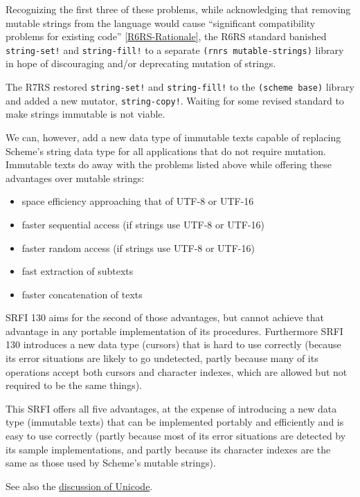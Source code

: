 Recognizing the first three of these problems, while acknowledging that
removing mutable strings from the language would cause ``significant
compatibility problems for existing code''
\protect\hyperlink{R6RS-Rationale}{{[}R6RS-Rationale{]}}, the R6RS
standard banished \texttt{string-set!} and \texttt{string-fill!} to a
separate \texttt{(rnrs\ mutable-strings)} library in hope of
discouraging and/or deprecating mutation of strings.

The R7RS restored \texttt{string-set!} and \texttt{string-fill!} to the
\texttt{(scheme\ base)} library and added a new mutator,
\texttt{string-copy!}. Waiting for some revised standard to make strings
immutable is not viable.

We can, however, add a new data type of immutable texts capable of
replacing Scheme's string data type for all applications that do not
require mutation. Immutable texts do away with the problems listed above
while offering these advantages over mutable strings:

\begin{itemize}
\tightlist
\item
  space efficiency approaching that of UTF-8 or UTF-16
\item
  faster sequential access (if strings use UTF-8 or UTF-16)
\item
  faster random access (if strings use UTF-8 or UTF-16)
\item
  fast extraction of subtexts
\item
  faster concatenation of texts
\end{itemize}

SRFI 130 aims for the second of those advantages, but cannot achieve
that advantage in any portable implementation of its procedures.
Furthermore SRFI 130 introduces a new data type (cursors) that is hard
to use correctly (because its error situations are likely to go
undetected, partly because many of its operations accept both cursors
and character indexes, which are allowed but not required to be the same
things).

This SRFI offers all five advantages, at the expense of introducing a
new data type (immutable texts) that can be implemented portably and
efficiently and is easy to use correctly (partly because most of its
error situations are detected by its sample implementations, and partly
because its character indexes are the same as those used by Scheme's
mutable strings).

See also the \protect\hyperlink{Unicode}{discussion of Unicode}.

